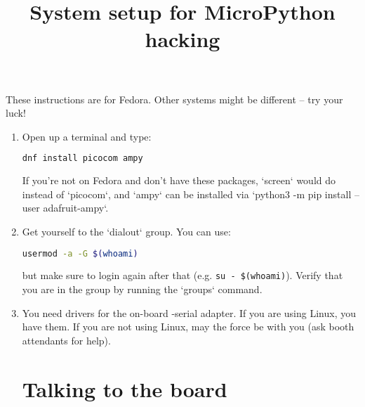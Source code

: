 \documentclass{../tutorial}
\title{System setup for MicroPython \abbr{ESP32} hacking}
\begin{document}
These instructions are for Fedora.
Other systems might be different – try your luck!

\begin{enumerate}

\section{Installation}

\item
    Open up a terminal and type:

    \begin{lstlisting}[language=bash]
    dnf install picocom ampy
    \end{lstlisting}

    If you're not on Fedora and don't have these packages,
    `screen` would do instead of `picocom`,
    and `ampy` can be installed via
    `python3 -m pip install --user adafruit-ampy`.

\item
    Get yourself to the `dialout` group.
    You can use:

    \begin{lstlisting}[language=bash]
    usermod -a -G $(whoami)
    \end{lstlisting}

    but make sure to login again after that
    (e.g. \lstinline|su - $(whoami)|).
    Verify that you are in the group by running the `groups` command.

    \begin{comment}
        The `dialout` group is historically designed for modems
        and gives you full and direct access to serial ports.
    \end{comment}

\item
    You need drivers for the on-board  -serial adapter.
    If you are using Linux, you have them.
    If you are not using Linux, may the force be with you
    (ask booth attendants for help).

\section{Talking to the board}

    \begin{comment}
        To protect delicate pins and make connections easier,
        the black \abbr{ESP32} devkit is plugged into a white OctopusLab Robot~Board.
        Please ask if you want to unplug it.
    \end{comment}


\end{enumerate}
\end{document}
